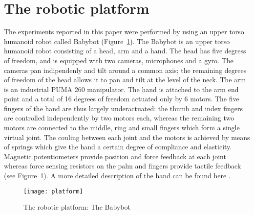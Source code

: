 \section{The robotic platform}
\label{sec-platform}
The experiments reported in this paper were performed by using an upper torso humanoid robot called Babybot (Figure~\ref{fig-platform}). The Babybot is an upper torso humanoid robot consisting of a head, arm and a hand. The head has five degress of freedom, and is equipped with two cameras, microphones and a gyro. The cameras pan indipendenly and tilt around a common axis; the remaining degrees of freedom of the head allows it to pan and tilt at the level of the neck. The arm is an industrial PUMA 260 manipulator. The hand is attached to the arm end point and a total of 16 degrees of freedom actuated only by 6 motors. The five fingers of the hand are thus largely underactuated: the thumb and index fingers are controlled independently by two motors each, whereas the remaining two motors are connected to the middle, ring and small fingers which form a single virtual joint. The couling between each joint and the motors is achieved by means of springs which give the hand a certain degree of compliance and elasticity. Magnetic potentiometers provide position and force feedback at each joint whereas force sensing resistors on the palm and fingers provide tactile feedback (see Figure~\ref{fig-platform}). A more detailed description of the hand can be found here \cite{natale04thesis}.

\begin{figure}
\centering
\texttt{[image: platform]}
\caption{The robotic platform: The Babybot}
\label{fig-platform}
\end{figure}
